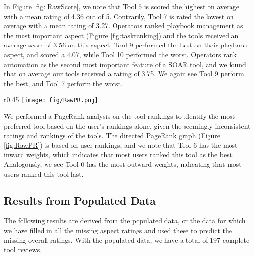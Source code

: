 In Figure \ref{fig: RawScore}, we note that Tool 6 is scored the highest on average with a mean rating of 4.36 out of 5. Contrarily, Tool 7 is rated the lowest on average with a mean rating of 3.27.  Operators ranked playbook management as the most important aspect (Figure \ref{fig:taskranking}) and the tools received an average score of 3.56 on this aspect. Tool 9 performed the best on their playbook aspect, and scored a 4.07, while Tool 10 performed the worst.  Operators rank automation as the second most important feature of a SOAR tool, and we found that on average our tools received a rating of 3.75. We again see Tool 9 perform the best, and Tool 7 perform the worst.

\begin{wrapfigure}[13]{r}{0.45\textwidth}
    \vspace{-13mm}
    \centering
    \texttt{[image: fig/RawPR.png]}
    \captionsetup{font = scriptsize}
    \captionsetup{width=0.8\textwidth}
    \caption{PageRank graphical network from raw data.}
    \label{fig:RawPR}
\end{wrapfigure}
We performed a PageRank analysis on the tool rankings to identify the most preferred tool based on the user's rankings alone, given the seemingly inconsistent ratings and rankings of the tools. The directed PageRank graph (Figure \ref{fig:RawPR}) is based on user rankings, and we note that Tool 6 has the most inward weights, which indicates that most users ranked this tool as the best. Analogously, we see Tool 0 has the most outward weights, indicating that most users ranked this tool last.
\vspace{-2mm}
\subsection{Results from Populated Data}
\vspace{-2mm}
The following results are derived from the populated data, or the data for which we have filled in all the missing aspect ratings and used these to predict the missing overall ratings. With the populated data, we have a total of 197 complete tool reviews. 

